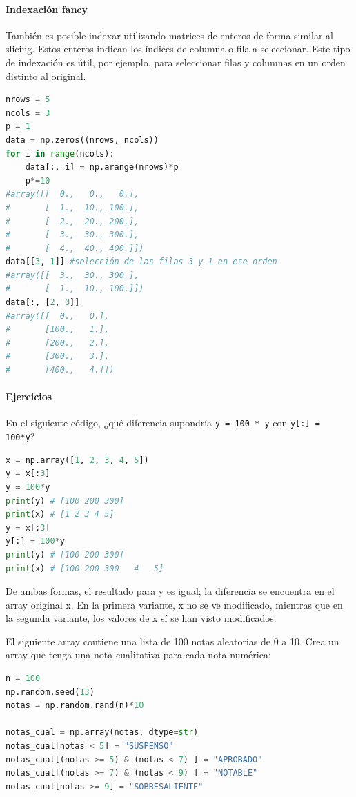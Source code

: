 \paragraph{Indexación fancy}
También es posible indexar utilizando matrices de enteros de forma similar al slicing. Estos enteros indican los índices de columna o fila a seleccionar. Este tipo de indexación es útil, por ejemplo, para seleccionar filas y columnas en un orden distinto al original.
\begin{lstlisting}[language=Python]
nrows = 5
ncols = 3
p = 1
data = np.zeros((nrows, ncols))
for i in range(ncols):
    data[:, i] = np.arange(nrows)*p
    p*=10
#array([[  0.,   0.,   0.],
#       [  1.,  10., 100.],
#       [  2.,  20., 200.],
#       [  3.,  30., 300.],
#       [  4.,  40., 400.]])
data[[3, 1]] #selección de las filas 3 y 1 en ese orden
#array([[  3.,  30., 300.],
#       [  1.,  10., 100.]])
data[:, [2, 0]]
#array([[  0.,   0.],
#       [100.,   1.],
#       [200.,   2.],
#       [300.,   3.],
#       [400.,   4.]])
\end{lstlisting}

\paragraph{Ejercicios} 
En el siguiente código, ¿qué diferencia supondría \texttt{y = 100 * y} con \texttt{y[:] = 100*y}?
\begin{lstlisting}[language=Python]
x = np.array([1, 2, 3, 4, 5])
y = x[:3]
y = 100*y
print(y) # [100 200 300]
print(x) # [1 2 3 4 5]
y = x[:3]
y[:] = 100*y
print(y) # [100 200 300]
print(x) # [100 200 300   4   5]
\end{lstlisting}
De ambas formas, el resultado para y es igual; la diferencia se encuentra en el array original x. En la primera variante, x no se ve modificado, mientras que en la segunda variante, los valores de x sí se han visto modificados.

El siguiente array contiene una lista de 100 notas aleatorias de 0 a 10. Crea un array que tenga una nota cualitativa para cada nota numérica:
\begin{lstlisting}[language=Python]
n = 100
np.random.seed(13)
notas = np.random.rand(n)*10

notas_cual = np.array(notas, dtype=str)
notas_cual[notas < 5] = "SUSPENSO"
notas_cual[(notas >= 5) & (notas < 7) ] = "APROBADO"
notas_cual[(notas >= 7) & (notas < 9) ] = "NOTABLE"
notas_cual[notas >= 9] = "SOBRESALIENTE"
\end{lstlisting}

